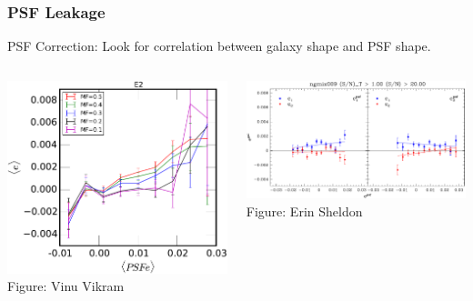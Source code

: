 \documentclass{beamer}
\begin{document}
\frame
{
    \frametitle{PSF Leakage}

    PSF Correction: Look for correlation between galaxy shape and PSF shape.

    \begin{columns}
        \begin{column}{0.4\textwidth}
            \begin{center}
                \includegraphics[width=\textwidth]{im3shape-PSF-E2.pdf}
                \newline
                {\tiny Figure: Vinu Vikram}
            \end{center}
        \end{column}
        \begin{column}{0.6\textwidth}
            \begin{center}
            \includegraphics[width=\textwidth]{ngmix009-e-vs-epsf-Ts2n-min-1-s2n-min-20.pdf}
                \newline
                {\tiny Figure: Erin Sheldon}
            \end{center}
        \end{column}
    \end{columns}
}
\end{document}
